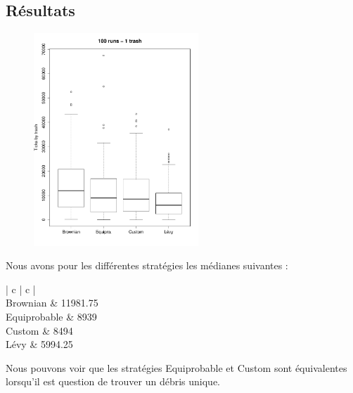 \subsection{Résultats}


\begin{figure}[H]
	\begin{center}
		\includegraphics[height=8cm]{diagrams/1Tr_all.pdf}
		\caption{}
		\label{fig:1Trash}
	\end{center}
\end{figure}


Nous avons pour les différentes stratégies les médianes suivantes :

\begin{tabular}{ | c | c | }
	\hline
	 \\
	\hline
	Brownian & 11981.75 \\
	Equiprobable & 8939 \\
	Custom & 8494 \\
	Lévy & 5994.25 \\
	\hline
\end{tabular}

Nous pouvons voir que les stratégies Equiprobable et Custom sont
équivalentes lorsqu'il est question de trouver un débris unique.


